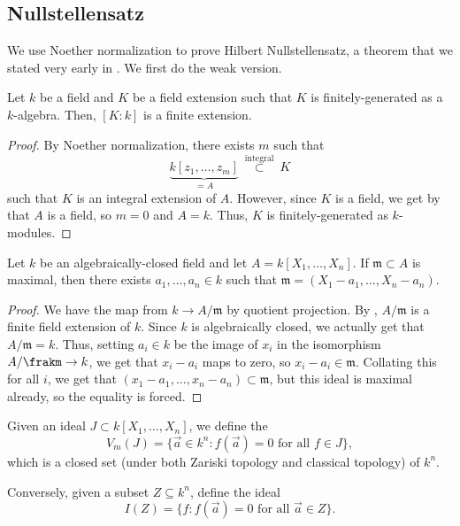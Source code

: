 \subsection{Nullstellensatz}
We use Noether normalization to prove Hilbert Nullstellensatz,
a theorem that we stated very early in .
We first do the weak version.
\begin{theorem}
    \label{thm:weak_nullstellensatz}
    Let $k$ be a field and $K$ be a field extension
    such that $K$ is finitely-generated as a $k$-algebra.
    Then, $[K:k]$ is a finite extension.
\end{theorem}
\begin{proof}
    By Noether normalization, there exists $m$ such that
    $$\underbrace{k[z_1,\dots,z_m]}_{=A} 
    \ \stackrel{\text{integral}}{\subset}\  K$$
    such that $K$ is an integral extension of $A$.
    However, since $K$ is a field, we get by  that $A$ is a field,
    so $m=0$ and $A=k$.
    Thus, $K$ is finitely-generated as $k$-modules.
\end{proof}
\begin{theorem}
    \label{thm:max_ideal_poly_ring}
    Let $k$ be an algebraically-closed field
    and let $A=k[X_1,\dots,X_n]$.
    If $\mathfrak m\subset A$ is maximal,
    then there exists $a_1,\dots,a_n\in k$ such that
    $\mathfrak m = (X_1-a_1,\dots,X_n-a_n)$.
\end{theorem}
\begin{proof}
    We have the map from $k\to A/\mathfrak m$
    by quotient projection.
    By , 
    $A/\mathfrak m$ is a finite field extension of $k$.
    Since $k$ is algebraically closed,
    we actually get that $A/\mathfrak m = k$.
    Thus, setting $a_i\in k$ be the image of $x_i$ in the
    isomorphism $A/\frakm \to k$,
    we get that $x_i-a_i$ maps to zero,
    so $x_i-a_i\in\mathfrak m$.
    Collating this for all $i$, we get that
    $(x_1-a_1,\dots,x_n-a_n)\subset\mathfrak m$,
    but this ideal is maximal already, so the equality is forced.
\end{proof}
\begin{definition}
Given an ideal $J\subset k[X_1,\dots,X_n]$,
we define the 
$$V_m(J) = \{\vec a\in k^n : f(\vec a)=0\text{ for all }f\in J\},$$
which is a closed set (under both Zariski topology and classical topology) of $k^n$.

Conversely, given a subset $Z\subseteq k^n$, define the ideal
$$I(Z) = \{f : f(\vec a)=0 \text{ for all }\vec a\in Z\}.$$
\end{definition}
